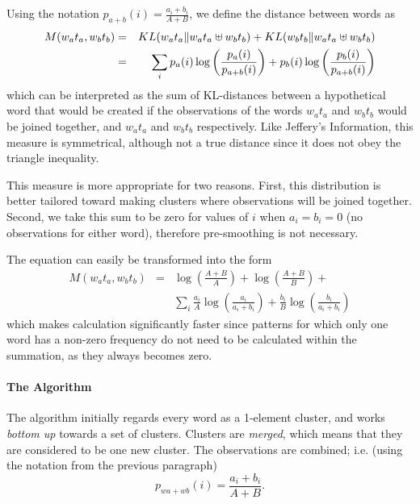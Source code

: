 Using the notation $p_{a+b}(i) = \frac{a_{i}+b_{i}}{A+B}$, we define the
distance between words as
\begin{eqnarray*}
M(w_{a}t_{a},w_{b}t_{b}) & = &
KL(w_{a}t_{a}\| w_{a}t_{a} \uplus w_{b}t_{b}) + 
     KL(w_{b}t_{b}\| w_{a}t_{a} \uplus w_{b}t_{b})  \vspace*{2cm} \\
& = & \sum_{i} p_{a}(i)\log\left(\frac{p_{a}(i)}{p_{a+b}(i)}\right) +
               p_{b}(i)\log\left(\frac{p_{b}(i)}{p_{a+b}(i)}\right)
\end{eqnarray*}
which can be interpreted as the sum of KL-distances between a hypothetical word
that would be created if the observations of the words $w_{a}t_{a}$ and
$w_{b}t_{b}$ would be joined together, and $w_{a}t_{a}$ and $w_{b}t_{b}$
respectively. Like Jeffery's Information, this measure is symmetrical, although
not a true distance since it does not obey the triangle inequality.

This measure is more appropriate for two reasons. First, this
distribution is better tailored toward making clusters where
observations will be joined together. Second, we take this sum to be
zero for values of $i$ when $a_{i} = b_{i} = 0$ (no observations for
either word), therefore pre-smoothing is not necessary.

The equation can easily be transformed into the form
\begin{eqnarray}
M(w_{a}t_{a},w_{b}t_{b}) & = & \log\left(\frac{A+B}{A}\right) + 
                 \log\left(\frac{A+B}{B}\right) +  \nonumber \\
& &      \sum_{i} \frac{a_{i}}{A}\log\left(\frac{a_{i}}{a_{i}+b_{i}}\right) +
         \frac{b_{i}}{B}\log\left(\frac{b_{i}}{a_{i}+b_{i}}\right) 
\label{newm}
\end{eqnarray}
which makes calculation significantly faster since patterns for which
only one word has a non-zero frequency do not need to be calculated within
the summation, as they always becomes zero.

\paragraph{The Algorithm}

The algorithm initially regards every word as a 1-element cluster, and works
{\em bottom up} towards a set of clusters. Clusters are {\em merged}, which
means that they are considered to be one new cluster. The observations are
combined; i.e. (using the notation from the previous paragraph)
\[
p_{wa+wb}(i) = \frac{a_{i}+b_{i}}{A+B} .
\]

